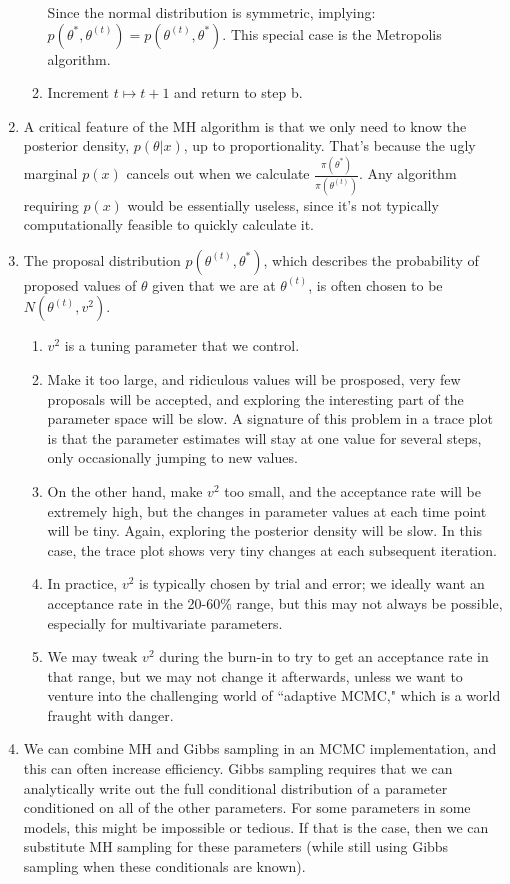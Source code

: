 \documentclass{article}
\begin{document}
\begin{enumerate}
\begin{enumerate}
   
  Since the normal distribution is symmetric, implying: $p(\theta^{*},\theta^{(t)})=p(\theta^{(t)},\theta^{*})$. This special case is the Metropolis algorithm.
   
    \item Increment $t\mapsto{}t+1$ and return to step b. 
    \end{enumerate}
    
 \item A critical feature of the MH algorithm is that we only need to know the posterior density, $p(\theta|x)$, up to proportionality.  That's because the ugly marginal $p(x)$ cancels out when we calculate $\frac{\pi(\theta^{*})}{\pi(\theta^{(t)})}$. Any algorithm requiring $p(x)$ would be essentially useless, since it's not typically computationally feasible to quickly calculate it.  
 \item The proposal distribution $p(\theta^{(t)},\theta^{*})$, which describes the probability of proposed values of $\theta$ given that we are at $\theta^{(t)}$, is often chosen to be $N(\theta^{(t)},v^{2})$.
 	\begin{enumerate}
 	\item $v^{2}$ is a tuning parameter that we control.
 	\item Make it too large, and ridiculous values will be prosposed, very few proposals will be accepted, and exploring the interesting part of the parameter space will be slow.  A signature of this problem in a trace plot is that the parameter estimates will stay at one value for several steps, only occasionally jumping to new values.  
 	\item On the other hand, make $v^{2}$ too small, and the acceptance rate will be extremely high, but the changes in parameter values at each time point will be tiny.  Again, exploring the posterior density will be slow.  In this case, the trace plot shows very tiny changes at each subsequent iteration.  
 	\item In practice, $v^{2}$ is typically chosen by trial and error; we ideally want an acceptance rate in the 20-60\% range, but this may not always be possible, especially for multivariate parameters.  
 	\item We may tweak $v^{2}$ during the burn-in to try to get an acceptance rate in that range, but we may not change it afterwards, unless we want to venture into the challenging world of ``adaptive MCMC," which is a world fraught with danger.  
 	\end{enumerate}
 \item We can combine MH and Gibbs sampling in an MCMC implementation, and this can often increase efficiency.  Gibbs sampling requires that we can analytically write out the full conditional distribution of a parameter conditioned on all of the other parameters.  For some parameters in some models, this might be impossible or tedious.  If that is the case, then we can substitute MH sampling for these parameters (while still using Gibbs sampling when these conditionals are known).  
\end{enumerate}
\end{document}
